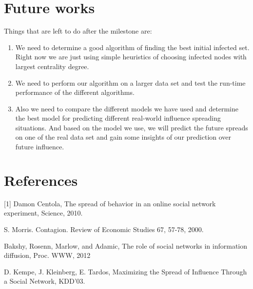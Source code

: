 \documentclass{article}
\begin{document}
\section{Future works}
Things that are left to do after the milestone are:
\begin{enumerate}
\item We need to determine a good algorithm of finding the best initial infected set. Right now we are just using simple heuristics of choosing infected nodes with largest centrality degree.
\item We need to perform our algorithm on a larger data set and test the run-time performance of the different algorithms.
\item Also we need to compare the different models we have used and determine the best model for predicting different real-world influence spreading situations. And based on the model we use, we will predict the future spreads on one of the real data set and gain some insights of our prediction over future influence.
\end{enumerate}

\section{References}
%
%
[1] Damon Centola, The spread of behavior in an online social network experiment, Science, 2010.

\noindent [2] S. Morris. Contagion. Review of Economic Studies 67, 57-78, 2000.

\noindent [3] Bakshy, Rosenn, Marlow, and Adamic, The role of social networks in information diffusion, Proc. WWW, 2012

\noindent [4] D. Kempe, J. Kleinberg, E. Tardos, Maximizing the Spread of Influence Through a Social Network, KDD'03.
\end{document}
